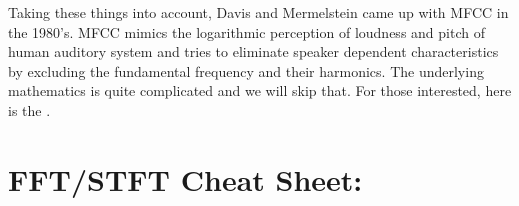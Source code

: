 \documentclass[letterpaper,10pt,english]{sphinxmanual}
\begin{document}
Taking these things into account, Davis and Mermelstein came up with MFCC in the 1980’s. MFCC mimics the logarithmic perception of loudness and pitch of human auditory system and tries to eliminate speaker dependent characteristics by excluding the fundamental frequency and their harmonics. The underlying mathematics is quite complicated and we will skip that. For those interested, here is the .



\section{FFT/STFT Cheat Sheet:}
\end{document}
